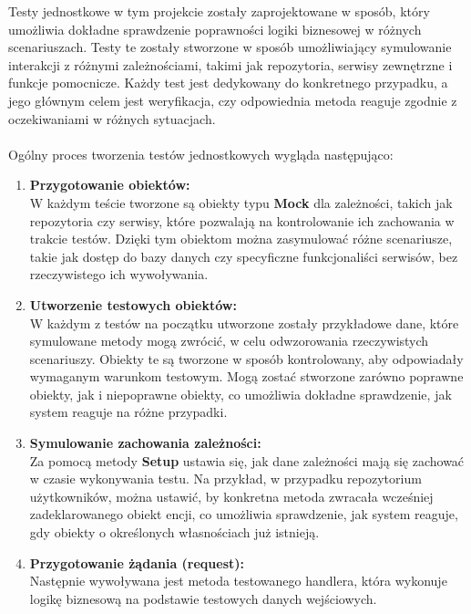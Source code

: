 \documentclass[12pt,a4paper]{article}
\begin{document}
\newpage

\noindent
Testy jednostkowe w tym projekcie zostały zaprojektowane w sposób, który umożliwia dokładne sprawdzenie poprawności logiki biznesowej w różnych scenariuszach. Testy te zostały stworzone w sposób umożliwiający symulowanie interakcji z różnymi zależnościami, takimi jak repozytoria, serwisy zewnętrzne i funkcje pomocnicze. Każdy test jest dedykowany do konkretnego przypadku, a jego głównym celem jest weryfikacja, czy odpowiednia metoda reaguje zgodnie z oczekiwaniami w różnych sytuacjach.
\\\\
Ogólny proces tworzenia testów jednostkowych wygląda następująco:

\begin{enumerate}
    \item \textbf{Przygotowanie obiektów:}\\
    W każdym teście tworzone są obiekty typu \textbf{Mock} dla zależności, takich jak repozytoria czy serwisy, które pozwalają na kontrolowanie ich zachowania w trakcie testów. Dzięki tym obiektom można zasymulować różne scenariusze, takie jak dostęp do bazy danych czy specyficzne funkcjonaliści serwisów, bez rzeczywistego ich wywoływania.

    \item \textbf{Utworzenie testowych obiektów:}\\
    W każdym z testów na początku utworzone zostały przykładowe dane, które symulowane metody mogą zwrócić, w celu odwzorowania rzeczywistych scenariuszy. Obiekty te są tworzone w sposób kontrolowany, aby odpowiadały wymaganym warunkom testowym. Mogą zostać stworzone zarówno poprawne obiekty, jak i niepoprawne obiekty, co umożliwia dokładne sprawdzenie, jak system reaguje na różne przypadki.

    \item \textbf{Symulowanie zachowania zależności:}\\
    Za pomocą metody \textbf{Setup} ustawia się, jak dane zależności mają się zachować w czasie wykonywania testu. Na przykład, w przypadku repozytorium użytkowników, można ustawić, by konkretna metoda zwracała wcześniej zadeklarowanego obiekt encji, co umożliwia sprawdzenie, jak system reaguje, gdy obiekty o określonych własnościach już istnieją.

    \item \textbf{Przygotowanie żądania (request):}\\
    Następnie wywoływana jest metoda testowanego handlera, która wykonuje logikę biznesową na podstawie testowych danych wejściowych.


\end{enumerate}
\end{document}

